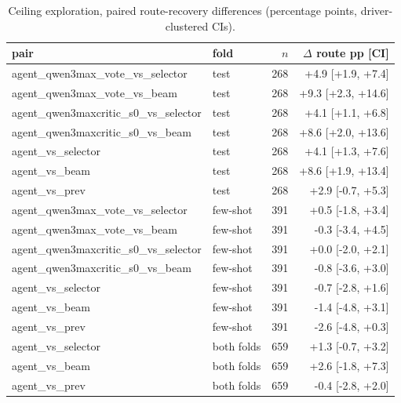 \begin{table}[H]\centering\scriptsize\setlength{\tabcolsep}{3pt}
\caption{Ceiling exploration, paired route-recovery differences (percentage points, driver-clustered CIs).}\label{tab:supp_agent_max_pairs}
\begin{tabular}{llrr}\toprule
pair & fold & $n$ & $\Delta$ route pp [CI] \\\midrule
agent\_qwen3max\_vote\_vs\_selector & test & 268 & +4.9 [+1.9, +7.4] \\
agent\_qwen3max\_vote\_vs\_beam & test & 268 & +9.3 [+2.3, +14.6] \\
agent\_qwen3maxcritic\_s0\_vs\_selector & test & 268 & +4.1 [+1.1, +6.8] \\
agent\_qwen3maxcritic\_s0\_vs\_beam & test & 268 & +8.6 [+2.0, +13.6] \\
agent\_vs\_selector & test & 268 & +4.1 [+1.3, +7.6] \\
agent\_vs\_beam & test & 268 & +8.6 [+1.9, +13.4] \\
agent\_vs\_prev & test & 268 & +2.9 [-0.7, +5.3] \\
agent\_qwen3max\_vote\_vs\_selector & few-shot & 391 & +0.5 [-1.8, +3.4] \\
agent\_qwen3max\_vote\_vs\_beam & few-shot & 391 & -0.3 [-3.4, +4.5] \\
agent\_qwen3maxcritic\_s0\_vs\_selector & few-shot & 391 & +0.0 [-2.0, +2.1] \\
agent\_qwen3maxcritic\_s0\_vs\_beam & few-shot & 391 & -0.8 [-3.6, +3.0] \\
agent\_vs\_selector & few-shot & 391 & -0.7 [-2.8, +1.6] \\
agent\_vs\_beam & few-shot & 391 & -1.4 [-4.8, +3.1] \\
agent\_vs\_prev & few-shot & 391 & -2.6 [-4.8, +0.3] \\
agent\_vs\_selector & both folds & 659 & +1.3 [-0.7, +3.2] \\
agent\_vs\_beam & both folds & 659 & +2.6 [-1.8, +7.3] \\
agent\_vs\_prev & both folds & 659 & -0.4 [-2.8, +2.0] \\
\bottomrule\end{tabular}
\end{table}

